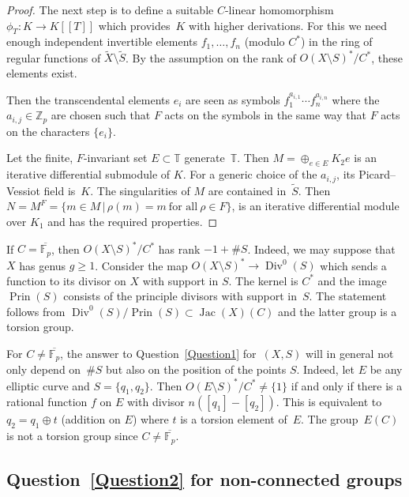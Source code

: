 \documentclass[10pt,a4paper]{amsart}
\numberwithin{equation}{section}
\begin{document}
\begin{proof}
The next step is to define a suitable $C$-linear homomorphism $\phi_T\colon K\rightarrow K[[T]]$ which provides~$K$ with higher derivations. For this we need enough independent invertible elements $f_1,\dots ,f_n$ (modulo $C^*$) in the ring of regular functions of $\tilde{X}\setminus \tilde{S}$. By the assumption on the rank of $O(X\setminus S)^*/C^*$, these elements exist.

Then the transcendental elements $e_i$ are seen as symbols $f_1^{a_{i,1}}\cdots f_n^{a_{i,n}}$ where the $a_{i,j}\in \mathbb{Z}_p$ are chosen such that $F$ acts on the symbols
in the same way that $F$ acts on the characters $\{e_i\}$.

Let the finite, $F$-invariant set $E\subset \mathbb{T}$ generate~$\mathbb{T}$. Then $M=\oplus _{e\in E}K_2e$ is an iterative differential submodule of $K$. For a generic choice of the $a_{i,j}$, its Picard--Vessiot field is~$K$. The singularities of $M$ are contained in~$\tilde{S}$. Then $N=M^F=\{m\in M\, | \, \rho(m)=m \ \text{for all} \ \rho \in F\}$,
is an iterative differential module over $K_1$ and has the required properties. \end{proof}

\begin{Remarks}\label{2.3} If $C=\overline{\mathbb{F}_p}$, then $O(X\setminus S)^*/C^*$ has rank $-1+\#S$. Indeed, we may suppose that $X$ has genus $g\geq 1$. Consider the map $O(X\setminus S)^*\rightarrow \operatorname{Div}^0(S)$ which sends a function to its divisor on $X$ with support in $S$. The kernel is $C^*$ and the image $\operatorname{Prin}(S)$ consists of the principle divisors with support in~$S$. The statement follows from $\operatorname{Div}^0(S)/\operatorname{Prin}(S)\subset \operatorname{Jac}(X)(C)$ and the latter group is a torsion group.

For $C\neq \overline{\mathbb{F}_p}$, the answer to Question~\ref{Question1} for~$(X,S)$ will in general not only depend on~$\# S$ but also on the position of the points $S$. Indeed, let $E$ be any elliptic curve and $S=\{q_1,q_2\}$. Then $O(E\setminus S)^*/C^*\neq \{1\}$ if and only if there is a rational function $f$ on $E$ with divisor $n([q_1]-[q_2])$. This is equivalent to $q_2=q_1\oplus t$ (addition on $E$) where $t$ is a torsion element of~$E$. The group~$E(C)$ is not a torsion group since $C\neq \overline{\mathbb{F}_p}$.\end{Remarks}

\subsection{Question~\ref{Question2} for non-connected groups}\label{section2.3}
\end{document}
